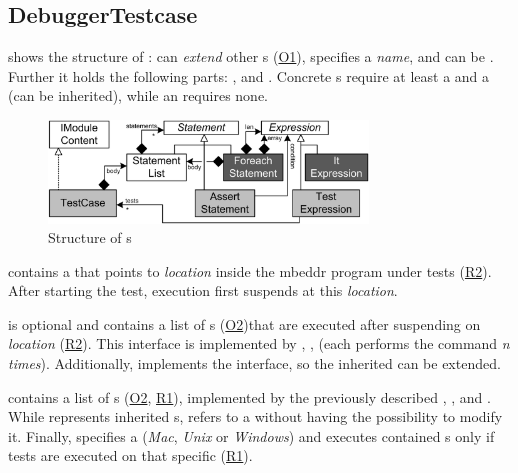 \subsection{DebuggerTestcase}

 shows the structure of
:
can \emph{extend} other s (\hyperref[O1]{O1}), specifies a
\emph{name}, and can be . Further it holds the following parts:
,  and
. Concrete s require at least  
a  and a  (can be inherited),
while an   requires none.
 
\begin{figure}[h]
  \vspace{-2mm}
  \centering
    \includegraphics[width=8.5cm]{./figures/umldiag.png} 
    \vspace{-2mm}
    \caption{Structure of s}
  \label{fig:DebuggerTestcaseStructure}
  \vspace{-2mm}
\end{figure}

 contains a  that points to
\emph{location} inside the mbeddr program under tests (\hyperref[R2]{R2}). 
After starting the test, execution first suspends at this \emph{location}. 

 is optional and contains a
list of s (\hyperref[O2]{O2})that are executed after
suspending on \emph{location} (\hyperref[R2]{R2}). This interface is implemented by 
, ,  (each performs the command
\emph{n times}). Additionally,  implements the interface, so
the inherited  can be extended.

 contains a list of s
(\hyperref[O2]{O2}, \hyperref[R1]{R1}), implemented by the previously described
, ,  and . 
While  represents inherited s,
 refers to a  without having the
possibility to modify it.
Finally,  specifies a  (\emph{Mac}, \emph{Unix} or
\emph{Windows}) and executes contained s only if tests are
executed on that specific  (\hyperref[R1]{R1}).

